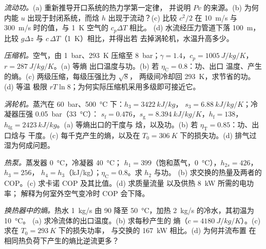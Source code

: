 \begin{exercise}[$\star\star$]\label{exo:b2:open-systems:5}
\emph{流动功。}(a) 重新推导开口系统的热力学第一定律，
并说明 $Pv$ 的来源。(b) 为何内能 $u$
出现于封闭系统，而焓 $h$ 出现于流动？(c) 比较 $c^2/2$ 在
\qty{10}{m/s} 与 \qty{300}{m/s} 时的值，与 \qty{1}{K} 空气的 $c_p\Delta T$ 相比。
(d) 水流经压力管道下落 \qty{100}{m}，比较 $g\Delta z$ 与
$c\,\Delta T$（\qty{1}{K}）相比，并得出若
去掉涡轮机，水温升高多少。
\end{exercise}

\begin{exercise}[$\star\star$]\label{exo:b2:open-systems:6}
\emph{压缩机。}空气，由 \qty{1}{bar}、\qty{293}{K} 压缩至 \qty{8}{bar}；$\gamma =
1.4$，$c_p = \qty{1005}{J/kg/K}$，$r = \qty{287}{J/kg/K}$。(a) 等熵
出口温度与功。(b) 若 $\eta_{\text{C}} = 0.8$：功、出口
温度、产生的熵。(c) 两级压缩，每级压强比为 $\sqrt8$，
两级间冷却回 \qty{293}{K}，求节省的功。(d) 等温
极限 $rT\ln 8$；为何实际压缩机采用多级即可接近它。
\end{exercise}

\begin{exercise}[$\star\star$]\label{exo:b2:open-systems:7}
\emph{涡轮机。}蒸汽在 \qty{60}{bar}、\qty{500}{\celsius} 下：$h_3 = \qty{3422}{kJ/kg}$，
$s_3 = \qty{6.88}{kJ/kg/K}$；冷凝器压强 \qty{0.05}{bar}（\qty{33}{\celsius}）：
$s_{\text{f}} = 0.476$，$s_{\text{g}} = \qty{8.394}{kJ/kg/K}$，$h_{\text{f}} = 138$，
$h_{\text{fg}} = \qty{2423}{kJ/kg}$。(a) 等熵出口的干度与
焓，以及功。(b) 若 $\eta_{\text{T}} = 0.85$：功、出口焓与
干度。(c) 每千克产生的熵，以及在 $T_0 =
\qty{306}{K}$ 下的损失功。(d) 排气过湿为何成问题。
\end{exercise}

\begin{exercise}[$\star\star$]\label{exo:b2:open-systems:8}
\emph{热泵。}蒸发器 \qty{0}{\celsius}，冷凝器 \qty{40}{\celsius}；
$h_1 = 399$（饱和蒸气，\qty{0}{\celsius}），$h_{2s} = 426$，$h_3 = 256$，
$h_4 = h_3$（\unit{kJ/kg}）；$\eta_{\text{C}} = 0.8$。求 $h_2$ 与功。
(b) 求交换的热量及两者的 COP。(c) 求卡诺 COP 及其比值。(d) 求质量流量
以及供热 \qty{8}{kW} 所需的电功率；
解释为何室外空气变冷时 COP 会下降。
\end{exercise}

\begin{exercise}[$\star\star$]\label{exo:b2:open-systems:9}
\emph{换热器中的熵。}热水 \qty{1}{kg/s} 由 \qty{90}{} 降至
\qty{50}{\celsius}，加热 \qty{2}{kg/s} 的冷水，其初温为 \qty{10}{\celsius}。
(a) 求冷流体的出口温度。(b) 求每秒产生的
熵（$c = \qty{4180}{J/kg/K}$）。(c) 求在 $T_0 = \qty{293}{K}$ 下的损失功率，
与交换的 \qty{167}{kW} 相比。(d) 为何并流布置
在相同热负荷下产生的熵比逆流更多？
\end{exercise}


